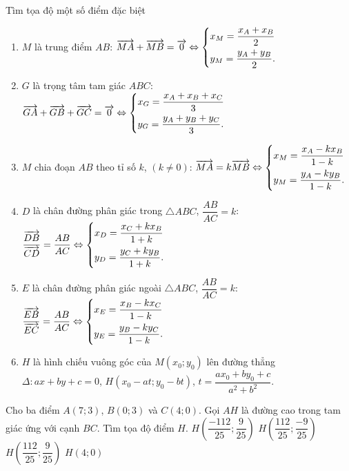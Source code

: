 \begin{dang}{Tìm tọa độ một số điểm đặc biệt}
	\begin{enumerate}
	\item $M$ là trung điểm $AB$: $\overrightarrow{MA} + \overrightarrow{MB} = \overrightarrow{0} \Leftrightarrow \left\{\begin{aligned}&x_M = \dfrac{x_A+x_B}{2}\\ &y_M= \dfrac{y_A+y_B}{2}.\end{aligned}\right.$
	\item $G$ là trọng tâm tam giác $ABC$: $\overrightarrow{GA} + \overrightarrow{GB} + \overrightarrow{GC}  = \overrightarrow{0} \Leftrightarrow \left\{\begin{aligned}&x_G = \dfrac{x_A+x_B+x_C}{3}\\ &y_G= \dfrac{y_A+y_B+y_C}{3}.\end{aligned}\right.$
		\item $M$ chia đoạn $AB$ theo tỉ số $k$, $(k \ne 0)$: $\overrightarrow{MA} =k \overrightarrow{MB}  \Leftrightarrow \left\{\begin{aligned}&x_M = \dfrac{x_A-kx_B}{1-k}\\ &y_M= \dfrac{y_A-ky_B}{1-k}.\end{aligned}\right.$
	\item $D$ là chân đường phân giác trong $\triangle ABC$, $\dfrac{AB}{AC} = k$: $\dfrac{ \overrightarrow{ DB}}{\overrightarrow{CD}} = \dfrac{AB}{AC} \Leftrightarrow \left\{\begin{aligned}&x_D = \dfrac{x_C+k x_B}{1+k}\\ &y_D= \dfrac{y_C+ky_B}{1+k}.\end{aligned}\right.$
	\item $E$ là chân đường phân giác ngoài $\triangle ABC$, $\dfrac{AB}{AC} = k$: $\dfrac{ \overrightarrow{ EB}}{\overrightarrow{EC}} = \dfrac{AB}{AC} \Leftrightarrow \left\{\begin{aligned}&x_E = \dfrac{x_B-k x_C}{1-k}\\ &y_E= \dfrac{y_B-ky_C}{1-k}.\end{aligned}\right.$
\item $H$ là hình chiếu vuông góc của $M(x_0;y_0)$ lên đường thẳng $\Delta: ax+by+c=0$, $H\left( x_0 -at;y_0 -bt\right) $, $t= \dfrac{a x_0 + b y_0 +c}{a^2 + b^2}$.
\end{enumerate}
\end{dang}
\begin{vd}%
Cho ba điểm $A(7;3)$, $B(0;3)$ và $C(4;0)$. Gọi $AH$ là đường cao trong tam giác ứng với cạnh $BC$. Tìm tọa độ điểm $H$.
	\choice
{$H\left( \dfrac{-112}{25};\dfrac{9}{25}\right) $}
{\True $H\left( \dfrac{112}{25};\dfrac{-9}{25}\right) $ }
{$H\left( \dfrac{112}{25};\dfrac{9}{25}\right) $}
{$H(4;0)$}
\end{vd}

